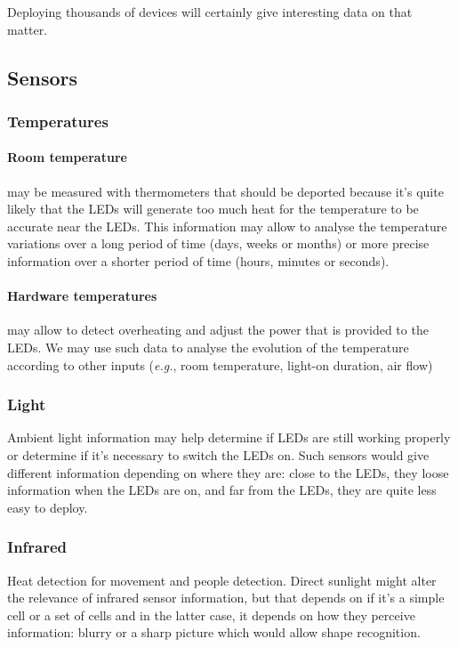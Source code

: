 \documentclass[12pt,twoside,a4paper]{article}
\def\eg{\emph{e.g.}}
\begin{document}
Deploying thousands of devices will certainly give interesting data
on that matter.


\subsection{Sensors}

\subsubsection{Temperatures}

\paragraph{Room  temperature} may be  measured with  thermometers that
should  be deported  because  it's  quite likely  that  the LEDs  will
generate too  much heat  for the temperature  to be accurate  near the
LEDs.   This   information  may  allow  to   analyse  the  temperature
variations over a long period of  time (days, weeks or months) or more
precise information over  a shorter period of time  (hours, minutes or
seconds).

\paragraph{Hardware temperatures} may  allow to detect overheating and
adjust the power that is provided to the LEDs. We may use such data to
analyse  the evolution of  the temperature  according to  other inputs
(\eg, room temperature, light-on duration, air flow)

\subsubsection{Light}

Ambient light information may help determine if LEDs are still working
properly or determine  if it's necessary to switch  the LEDs on.  Such
sensors would give different  information depending on where they are:
close to  the LEDs, they loose  information when the LEDs  are on, and
far from the LEDs, they are quite less easy to deploy.

\subsubsection{Infrared}

Heat  detection for  movement and  people detection.   Direct sunlight
might  alter the relevance  of infrared  sensor information,  but that
depends on if it's  a simple cell or a set of  cells and in the latter
case, it depends on how they perceive information: blurry or a sharp
picture which would allow shape recognition.
\end{document}
